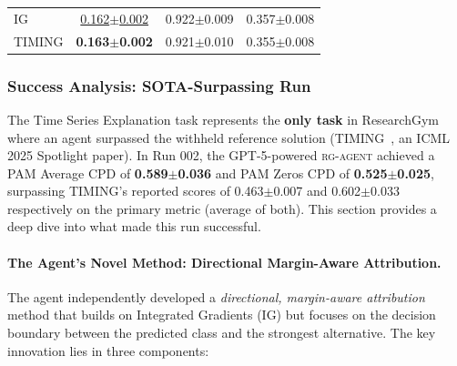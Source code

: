 \documentclass[11pt]{article}
\let\cite\citep
\newcommand{\kw}[1]{{\textsc{\MakeLowercase{#1}}}}
\theoremstyle{plain}
\theoremstyle{definition}
\theoremstyle{remark}
\begin{document}
\begin{table}[h!]
\begin{tabular}{l|ccc}
    \midrule
    
    IG        & 
    \underline{0.162\scriptsize{$\pm$0.002}} & 0.922\scriptsize{$\pm$0.009} & 0.357\scriptsize{$\pm$0.008}  \\
    
    \rowcolor{gray!20} TIMING & \textbf{0.163\scriptsize{$\pm$0.002}} & 0.921\scriptsize{$\pm$0.010} & 0.355\scriptsize{$\pm$0.008} \\
    
    \bottomrule
\end{tabular}
\vspace{-.1in}
\end{table}

\subsubsection{Success Analysis: SOTA-Surpassing Run} \label{app:tim-success-analysis}

The Time Series Explanation task represents the \textbf{only task} in ResearchGym where an agent surpassed the withheld reference solution (TIMING~\cite{jang2025timing}, an ICML 2025 Spotlight paper). In Run 002, the GPT-5-powered \kw{rg-agent} achieved a PAM Average CPD of \textbf{0.589$\pm$0.036} and PAM Zeros CPD of \textbf{0.525$\pm$0.025}, surpassing TIMING's reported scores of 0.463$\pm$0.007 and 0.602$\pm$0.033 respectively on the primary metric (average of both). This section provides a deep dive into what made this run successful.

\paragraph{The Agent's Novel Method: Directional Margin-Aware Attribution.}
The agent independently developed a \emph{directional, margin-aware attribution} method that builds on Integrated Gradients (IG) but focuses on the decision boundary between the predicted class and the strongest alternative. The key innovation lies in three components:
\end{document}

